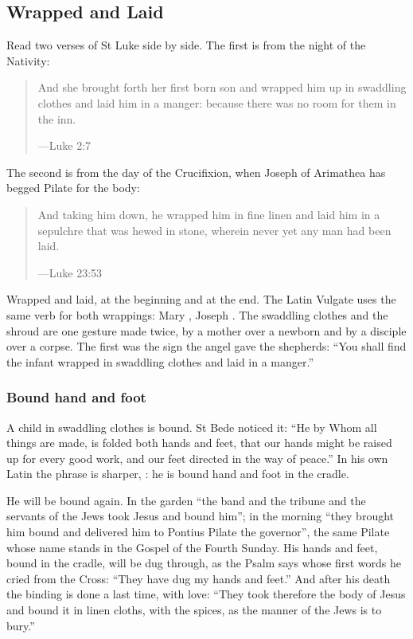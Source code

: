 \subsection{Wrapped and Laid}\label{sec:wrapped}

Read two verses of St Luke side by side. The first is from the night of the
Nativity:

\begin{quote}
And she brought forth her first born son and wrapped him up in swaddling clothes
and laid him in a manger: because there was no room for them in the inn.\par
{\smallskip\noindent\small ---Luke 2:7\par}
\end{quote}

The second is from the day of the Crucifixion, when Joseph of Arimathea has
begged Pilate for the body:

\begin{quote}
And taking him down, he wrapped him in fine linen and laid him in a sepulchre
that was hewed in stone, wherein never yet any man had been laid.\par
{\smallskip\noindent\small ---Luke 23:53\par}
\end{quote}

Wrapped and laid, at the beginning and at the end. The Latin Vulgate uses the
same verb for both wrappings: Mary ,
Joseph . The swaddling clothes and the shroud are one
gesture made twice, by a mother over a newborn and by a disciple over a corpse.
The first was the sign the angel gave the shepherds: ``You shall find the
infant wrapped in swaddling clothes and laid in a manger.''

\subsubsection*{Bound hand and foot}

A child in swaddling clothes is bound. St Bede noticed it: ``He by Whom all
things are made, is folded both hands and feet, that our hands might be raised
up for every good work, and our feet directed in the way of peace.'' In his own
Latin the phrase is sharper, : he is
bound hand and foot in the cradle.

He will be bound again. In the garden ``the band and the tribune and the
servants of the Jews took Jesus and bound him''; in the morning ``they brought
him bound and delivered him to Pontius Pilate the governor'', the same Pilate
whose name stands in the Gospel of the Fourth Sunday.
His hands and feet, bound in the cradle, will be dug through, as the Psalm says
whose first words he cried from the Cross: ``They have dug my hands and
feet.'' And after his
death the binding is done a last time, with love: ``They took therefore the
body of Jesus and bound it in linen cloths, with the spices, as the manner of
the Jews is to bury.''

